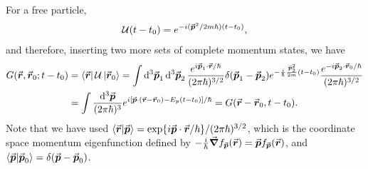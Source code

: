 {For a free particle,
\begin{eqnarray}
    \mathcal{U}(t - t_0) = e^{-i (\va*{p}^2/2 m \hbar) (t - t_0) }
,\end{eqnarray}
and therefore, inserting two more sets of complete momentum states, we have
\begin{eqnarray}
    \begin{aligned}
        G(\va*{r},\va*{r}_{0};t-t_0) &= \bra{\va*{r}} \mathcal{U} \ket{\va*{r}_{0}} = \int \dd[3]{\va*{p}_{1}} \dd[3]{\va*{p}_{2}} \frac{e^{i \va*{p}_{1} \cdot \va*{r} / \hbar}}{(2 \pi \hbar)^{3/2}} \delta(\va*{p}_{1} - \va*{p}_{2}) e^{-\frac{i}{\hbar} \frac{\va*{p}_{2}^2}{2m} (t - t_0)} \frac{e^{-i \va*{p}_{2} \cdot \va*{r}_{0} / \hbar}}{(2 \pi \hbar)^{3/2}} \\
                                     &= \int \frac{\dd[3]{\va*{p}}}{(2 \pi \hbar)^3} e^{i [ \va*{p} \cdot (\va*{r} - \va*{r}_{0}) - E_{p}(t - t_0) ]/\hbar} = G(\va*{r} - \va*{r}_{0},t-t_0)
    .\end{aligned}
\end{eqnarray}
Note that we have used $\bra{\va*{r}}\ket{\va*{p}} = \exp{i \va*{p} \cdot \va*{r} / \hbar}/(2 \pi \hbar)^{3/2}$, which is the coordinate space momentum eigenfunction defined by $- \frac{i}{\hbar} \grad f_{\va*{p}}(\va*{r}) = \va*{p} f_{\va*{p}}(\va*{r})$, and $\bra{\va*{p}}\ket{\va*{p}_{0}} = \delta(\va*{p} - \va*{p}_{0})$.

}
